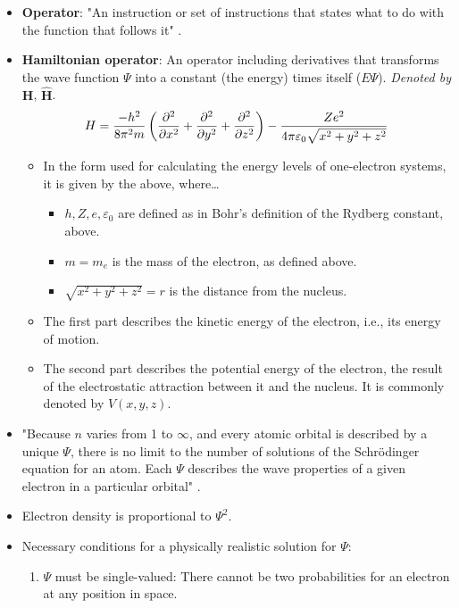 \documentclass[../notes.tex]{subfiles}
\begin{document}
\begin{itemize}
    \item \textbf{Operator}: "An instruction or set of instructions that states what to do with the function that follows it" \parencite[14]{bib:MiesslerFischerTarr}.
    \item \textbf{Hamiltonian operator}: An operator including derivatives that transforms the wave function $\Psi$ into a constant (the energy) times itself ($E\Psi$). \emph{Denoted by} $\bm{H}$, $\bm{\hat{H}}$.
    \begin{equation*}
        H = \frac{-h^2}{8\pi^2m}\left( \pdv[2]{x}+\pdv[2]{y}+\pdv[2]{z} \right)-\frac{Ze^2}{4\pi\varepsilon_0\sqrt{x^2+y^2+z^2}}
    \end{equation*}
    \begin{itemize}
        \item In the form used for calculating the energy levels of one-electron systems, it is given by the above, where\dots
        \begin{itemize}
            \item $h,Z,e,\varepsilon_0$ are defined as in Bohr's definition of the Rydberg constant, above.
            \item $m=m_e$ is the mass of the electron, as defined above.
            \item $\sqrt{x^2+y^2+z^2}=r$ is the distance from the nucleus.
        \end{itemize}
        \item The first part describes the kinetic energy of the electron, i.e., its energy of motion.
        \item The second part describes the potential energy of the electron, the result of the electrostatic attraction between it and the nucleus. It is commonly denoted by $V(x,y,z)$.
    \end{itemize}
    \item "Because $n$ varies from 1 to $\infty$, and every atomic orbital is described by a unique $\Psi$, there is no limit to the number of solutions of the Schr\"{o}dinger equation for an atom. Each $\Psi$ describes the wave properties of a given electron in a particular orbital" \parencite[15]{bib:MiesslerFischerTarr}.
    \item Electron density is proportional to $\Psi^2$.
    \item Necessary conditions for a physically realistic solution for $\Psi$:
    \begin{enumerate}
        \item $\Psi$ must be single-valued: There cannot be two probabilities for an electron at any position in space.

\end{enumerate}
\end{itemize}
\end{document}
